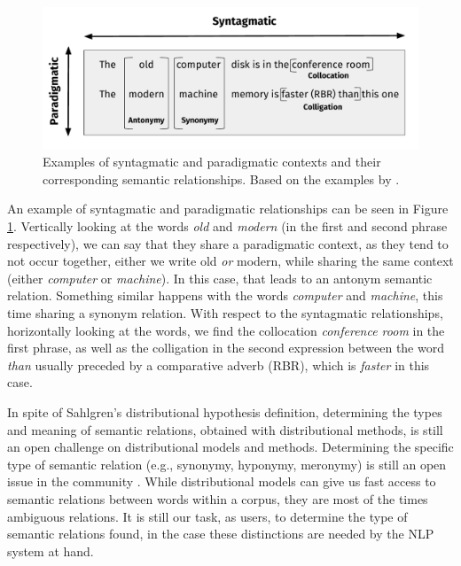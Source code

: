 \begin{figure}
\centering
\includegraphics[width=\linewidth]{images/Chapitre2/sintagmatic_paradigmatic.pdf}
\caption{Examples of syntagmatic and paradigmatic contexts and their corresponding semantic relationships. Based on the examples by \cite{sahlgren2008distributional,piero2017}.}
\label{fig:sintagmatic_paradigmatic}
\end{figure}


An example of syntagmatic and paradigmatic relationships can be seen in Figure \ref{fig:sintagmatic_paradigmatic}. Vertically looking at the words \textit{old} and \textit{modern} (in the first and second phrase respectively), we can say that they  share a paradigmatic context, as they tend to not occur together, either we write old \textit{or} modern, while sharing the same context (either \textit{computer} or \textit{machine}). In this case, that leads to an antonym semantic relation. Something similar happens with the words \textit{computer} and \textit{machine}, this time sharing a synonym relation. With respect to the syntagmatic relationships, horizontally looking at the words, we find the collocation \textit{conference room} in the first phrase, as well as the colligation in the second expression between the word \textit{than} usually preceded by a  comparative adverb (RBR), which is \textit{faster} in this case. 

In spite of Sahlgren's  distributional hypothesis definition, determining the types and meaning of semantic relations, obtained with distributional methods, is still an open challenge on distributional models and methods. Determining the specific type of semantic relation (e.g., synonymy, hyponymy, meronymy) is still an open issue in the community \cite{turney2010,fabre2015,perinet2015}. While distributional models can give us fast access  to semantic relations between words within a corpus, they are most of the times ambiguous relations. It is still our task, as users, to determine the type of semantic relations found, in the case these distinctions are needed by the NLP system  at hand.


